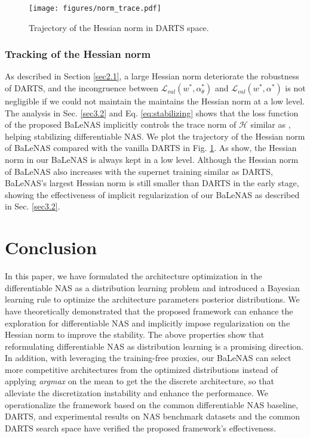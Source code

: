 \documentclass[10pt,twocolumn,letterpaper]{article}
\begin{document}
\begin{figure}[t]
  \centering
  \texttt{[image: figures/norm\_trace.pdf]}
  \caption{Trajectory of the Hessian norm in DARTS space.}
\label{fig:trace_norm}
\vspace{-2mm}
\end{figure}


\subsubsection{Tracking of the Hessian norm}
As described in Section \ref{sec2.1}, a large Hessian norm deteriorate the robustness of DARTS, and the incongruence between $\mathcal{L}_{val}(w^*,\alpha_{\theta}^*)$ and $\mathcal{L}_{val}(w^*,\alpha^*)$ is not negligible if we could not maintain the maintains the Hessian norm at a low level. The analysis in Sec. \ref{sec3.2} and Eq. \eqref{eq:stabilizing} shows that the loss function of the proposed BaLeNAS implicitly controls the trace norm of $\mathcal{H}$ similar as \cite{chen2020stabilizing,chen2020drnas}, helping stabilizing differentiable NAS. We plot the trajectory of the Hessian norm of BaLeNAS compared with the vanilla DARTS in Fig. \ref{fig:trace_norm}. As show, the Hessian norm in our BaLeNAS is always kept in a low level. Although the Hessian norm of BaLeNAS also increases with the supernet training similar as DARTS, BaLeNAS's largest Hessian norm is still smaller than DARTS in the early stage, showing the effectiveness of implicit regularization of our BaLeNAS as described in Sec. \ref{sec3.2}.

\section{Conclusion}
In this paper, we have formulated the architecture optimization in the differentiable NAS as a distribution learning problem and introduced a Bayesian learning rule to optimize the architecture parameters posterior distributions. We have theoretically demonstrated that the proposed framework can enhance the exploration for differentiable NAS and implicitly impose regularization on the Hessian norm to improve the stability. The above properties show that reformulating differentiable NAS as distribution learning is a promising direction. In addition, with leveraging the training-free proxies, our BaLeNAS can select more competitive architectures from the optimized distributions instead of applying \textit{argmax} on the mean to get the the discrete architecture, so that alleviate the discretization instability and enhance the performance. We operationalize the framework based on the common differentiable NAS baseline, DARTS, and experimental results on NAS benchmark datasets and the common DARTS search space have verified the proposed framework's effectiveness. 
\end{document}

